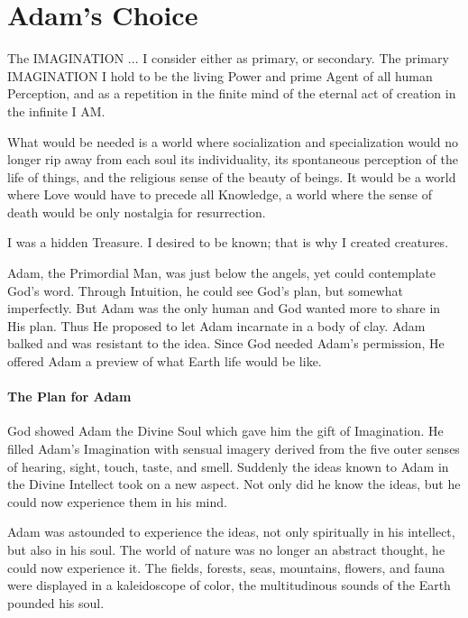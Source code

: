 \section{Adam’s Choice}

\begin{quotex}
The IMAGINATION ... I consider either as primary, or secondary. The primary IMAGINATION I hold to be the living Power and prime Agent of all human Perception, and as a repetition in the finite mind of the eternal act of creation in the infinite I AM.

What would be needed is a world where socialization and specialization would no longer rip away from each soul its individuality, its spontaneous perception of the life of things, and the religious sense of the beauty of beings. It would be a world where Love would have to precede all Knowledge, a world where the sense of death would be only nostalgia for resurrection.

I was a hidden Treasure. I desired to be known; that is why I created creatures.
\end{quotex}


Adam, the Primordial Man, was just below the angels, yet could contemplate God's word. Through Intuition, he could see God's plan, but somewhat imperfectly. But Adam was the only human and God wanted more to share in His plan. Thus He proposed to let Adam incarnate in a body of clay. Adam balked and was resistant to the idea. Since God needed Adam's permission, He offered Adam a preview of what Earth life would be like.

\paragraph{The Plan for Adam}


God showed Adam the Divine Soul which gave him the gift of Imagination. He filled Adam's Imagination with sensual imagery derived from the five outer senses of hearing, sight, touch, taste, and smell. Suddenly the ideas known to Adam in the Divine Intellect took on a new aspect. Not only did he know the ideas, but he could now experience them in his mind.

Adam was astounded to experience the ideas, not only spiritually in his intellect, but also in his soul. The world of nature was no longer an abstract thought, he could now experience it. The fields, forests, seas, mountains, flowers, and fauna were displayed in a kaleidoscope of color, the multitudinous sounds of the Earth pounded his soul.

